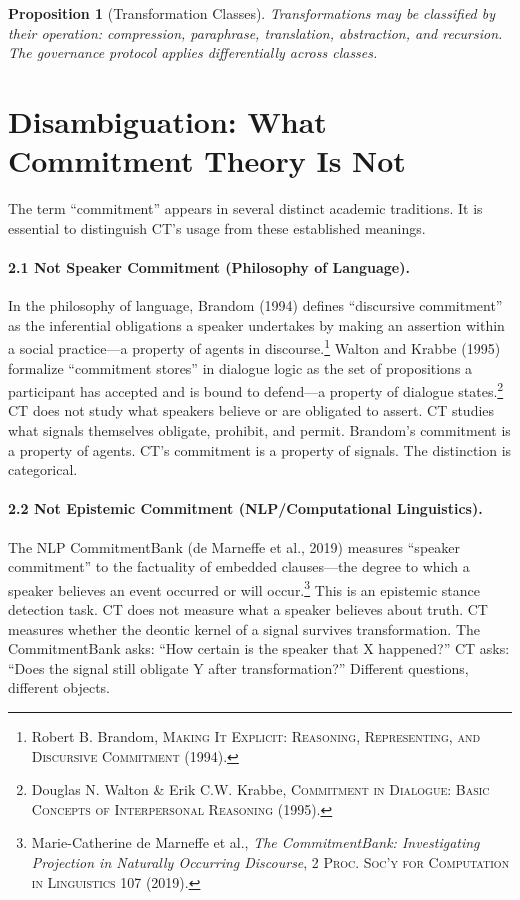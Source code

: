 \documentclass[11pt,a4paper]{article}
\newtheorem{proposition}{Proposition}[section]
\begin{document}
\begin{proposition}[Transformation Classes]
Transformations may be classified by their operation: compression, paraphrase, translation, abstraction, and recursion. The governance protocol applies differentially across classes.
\end{proposition}

\section{Disambiguation: What Commitment Theory Is Not}

The term ``commitment'' appears in several distinct academic traditions. It is essential to distinguish CT's usage from these established meanings.

\paragraph{2.1 Not Speaker Commitment (Philosophy of Language).}
In the philosophy of language, Brandom (1994) defines ``discursive commitment'' as the inferential obligations a speaker undertakes by making an assertion within a social practice---a property of agents in discourse.\footnote{Robert B. Brandom, \textsc{Making It Explicit: Reasoning, Representing, and Discursive Commitment} (1994).} Walton and Krabbe (1995) formalize ``commitment stores'' in dialogue logic as the set of propositions a participant has accepted and is bound to defend---a property of dialogue states.\footnote{Douglas N. Walton \& Erik C.W. Krabbe, \textsc{Commitment in Dialogue: Basic Concepts of Interpersonal Reasoning} (1995).} CT does not study what speakers believe or are obligated to assert. CT studies what signals themselves obligate, prohibit, and permit. Brandom's commitment is a property of agents. CT's commitment is a property of signals. The distinction is categorical.

\paragraph{2.2 Not Epistemic Commitment (NLP/Computational Linguistics).}
The NLP CommitmentBank (de Marneffe et al., 2019) measures ``speaker commitment'' to the factuality of embedded clauses---the degree to which a speaker believes an event occurred or will occur.\footnote{Marie-Catherine de Marneffe et al., \textit{The CommitmentBank: Investigating Projection in Naturally Occurring Discourse}, 2 \textsc{Proc. Soc'y for Computation in Linguistics} 107 (2019).} This is an epistemic stance detection task. CT does not measure what a speaker believes about truth. CT measures whether the deontic kernel of a signal survives transformation. The CommitmentBank asks: ``How certain is the speaker that X happened?'' CT asks: ``Does the signal still obligate Y after transformation?'' Different questions, different objects.
\end{document}
